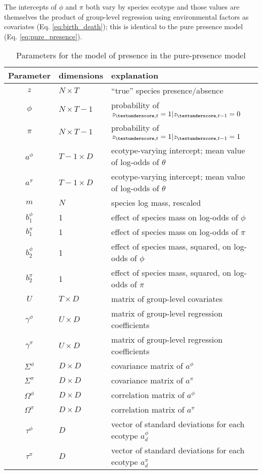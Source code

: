 \documentclass[12pt,letterpaper]{article}
\begin{document}
The intercepts of \(\phi\) and \(\pi\) both vary by species ecotype and those values are themselves the product of group-level regression using environmental factors as covariates (Eq. \ref{eq:birth_death}); this is identical to the pure presence model (Eq. \ref{eq:pure_presence}).

\begin{table}
  \centering
  \caption{Parameters for the model of presence in the pure-presence model}
  \begin{tabular}{c l l}
    Parameter & dimensions & explanation \\
    \hline
    \(z\) & \(N \times T\) & ``true'' species presence/absence \\
    \(\phi\) & \(N \times T - 1\) & probability of \(z_{\textunderscore, t} = 1 | z_{\textunderscore, t - 1} = 0 \) \\
    \(\pi\) & \(N \times T - 1\) & probability of \(z_{\textunderscore, t} = 1 | z_{\textunderscore, t - 1} = 1 \) \\
    \(a^{\phi}\) & \(T - 1 \times D\) & ecotype-varying intercept; mean value of log-odds of \(\theta\) \\
    \(a^{\pi}\) & \(T - 1 \times D\) & ecotype-varying intercept; mean value of log-odds of \(\theta\) \\
    \(m\) & \(N\) & species log mass, rescaled \\
    \(b^{\phi}_{1}\) & 1 & effect of species mass on log-odds of \(\phi\) \\
    \(b^{\pi}_{1}\) & 1 & effect of species mass on log-odds of \(\pi\) \\
    \(b^{\phi}_{2}\) & 1 & effect of species mass, squared, on log-odds of \(\phi\) \\
    \(b^{\pi}_{2}\) & 1 & effect of species mass, squared, on log-odds of \(\pi\) \\
    \(U\) & \(T \times D\) & matrix of group-level covariates \\
    \(\gamma^{\phi}\) & \(U \times D\) & matrix of group-level regression coefficients \\
    \(\gamma^{\pi}\) & \(U \times D\) & matrix of group-level regression coefficients \\
    \(\Sigma^{\phi}\) & \(D \times D\) & covariance matrix of \(a^{\phi}\) \\
    \(\Sigma^{\pi}\) & \(D \times D\) & covariance matrix of \(a^{\pi}\) \\
    \(\Omega^{\phi}\) & \(D \times D\) & correlation matrix of \(a^{\phi}\) \\
    \(\Omega^{\pi}\) & \(D \times D\) & correlation matrix of \(a^{\pi}\) \\
    \(\tau^{\phi}\) & \(D\) & vector of standard deviations for each ecotype \(a^{\phi}_{d}\) \\
    \(\tau^{\pi}\) & \(D\) & vector of standard deviations for each ecotype \(a^{\pi}_{d}\) \\
  \end{tabular}
  \label{tab:bd_param}
\end{table}
\end{document}
